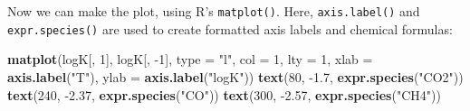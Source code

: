 \documentclass[]{tufte-handout}
\newenvironment{Shaded}{}{}
\newcommand{\KeywordTok}[1]{\textcolor[rgb]{0.00,0.44,0.13}{\textbf{#1}}}
\newcommand{\DataTypeTok}[1]{\textcolor[rgb]{0.56,0.13,0.00}{#1}}
\newcommand{\DecValTok}[1]{\textcolor[rgb]{0.25,0.63,0.44}{#1}}
\newcommand{\FloatTok}[1]{\textcolor[rgb]{0.25,0.63,0.44}{#1}}
\newcommand{\StringTok}[1]{\textcolor[rgb]{0.25,0.44,0.63}{#1}}
\newcommand{\OperatorTok}[1]{\textcolor[rgb]{0.40,0.40,0.40}{#1}}
\newcommand{\NormalTok}[1]{#1}
\begin{document}
\begin{Shaded}
\end{Shaded}

Now we can make the plot, using R's \texttt{matplot()}. Here,
{\texttt{axis.label()}} and {\texttt{expr.species()}} are used to create
formatted axis labels and chemical formulas:

\begin{Shaded}
\begin{Highlighting}[]
\KeywordTok{matplot}\NormalTok{(logK[, }\DecValTok{1}\NormalTok{], logK[, }\OperatorTok{-}\DecValTok{1}\NormalTok{], }\DataTypeTok{type =} \StringTok{"l"}\NormalTok{, }\DataTypeTok{col =} \DecValTok{1}\NormalTok{, }\DataTypeTok{lty =} \DecValTok{1}\NormalTok{,}
        \DataTypeTok{xlab =} \KeywordTok{axis.label}\NormalTok{(}\StringTok{"T"}\NormalTok{), }\DataTypeTok{ylab =} \KeywordTok{axis.label}\NormalTok{(}\StringTok{"logK"}\NormalTok{))}
\KeywordTok{text}\NormalTok{(}\DecValTok{80}\NormalTok{, }\OperatorTok{-}\FloatTok{1.7}\NormalTok{, }\KeywordTok{expr.species}\NormalTok{(}\StringTok{"CO2"}\NormalTok{))}
\KeywordTok{text}\NormalTok{(}\DecValTok{240}\NormalTok{, }\OperatorTok{-}\FloatTok{2.37}\NormalTok{, }\KeywordTok{expr.species}\NormalTok{(}\StringTok{"CO"}\NormalTok{))}
\KeywordTok{text}\NormalTok{(}\DecValTok{300}\NormalTok{, }\OperatorTok{-}\FloatTok{2.57}\NormalTok{, }\KeywordTok{expr.species}\NormalTok{(}\StringTok{"CH4"}\NormalTok{))}
\end{Highlighting}
\end{Shaded}
\end{document}
